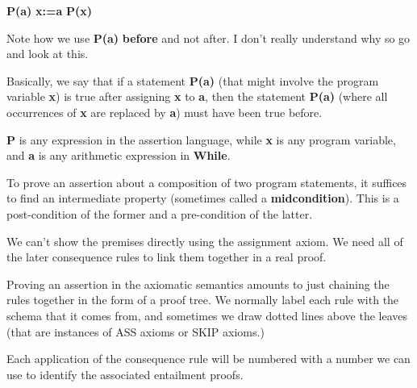 \documentclass[11pt,a4paper,titlepage,dvipsnames,cmyk]{scrartcl}
\begin{document}
\begin{center}
    {\color{blue}\textbf{P(a)}} {\color{green}\textbf{x:=a}}
    {\color{blue}\textbf{P(x)}}
\end{center}

Note how we use {\color{blue}\textbf{P(a)}} \textbf{before} and not after.
I don't really understand why so go and look at this.

Basically, we say that if a statement {\color{blue}\textbf{P(a)}} (that
might involve the program variable \textbf{x}) is true after assigning
\textbf{x} to \textbf{a}, then the statement {\color{blue}\textbf{P(a)}}
(where all occurrences of \textbf{x} are replaced by \textbf{a}) must have
been true before.

\textbf{P} is any expression in the assertion language, while \textbf{x}
is any program variable, and \textbf{a} is any arithmetic expression in
\textbf{While}.

To prove an assertion about a composition of two program statements, it
suffices to find an intermediate property (sometimes called a
\textbf{midcondition}). This is a post-condition of the former and a
pre-condition of the latter.

We can't show the premises directly using the assignment axiom. We need
all of the later consequence rules to link them together in a real proof.

Proving an assertion in the axiomatic semantics amounts to just chaining
the rules together in the form of a proof tree. We normally label each
rule with the schema that it comes from, and sometimes we draw dotted
lines above the leaves (that are instances of ASS axioms or SKIP axioms.)

Each application of the consequence rule will be numbered with a number we
can use to identify the associated entailment proofs.
\end{document}
